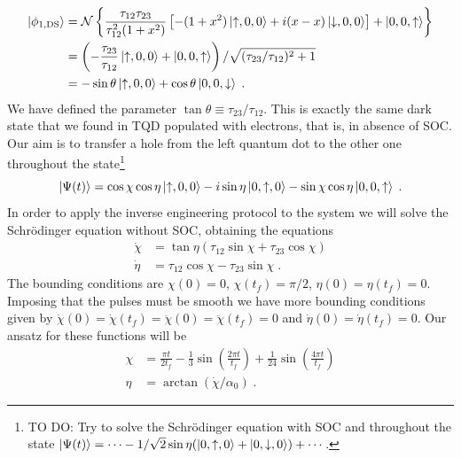 \documentclass[a4paper,11pt]{article}
\begin{document}
\begin{equation}
	\begin{split}
	\ket{\phi_{1,\text{DS}}}&=\mathcal{N}\left\{\frac{\tau_{12}\tau_{23}}{\tau_{12}^2(1+x^2)}\left[-(1+x^2)\ket{\uparrow,0,0}+i(x-x)\ket{\downarrow,0,0}\right]+\ket{0,0,\uparrow}\right\}\\
	&=\left(-\frac{\tau_{23}}{\tau_{12}}\ket{\uparrow,0,0}+\ket{0,0,\uparrow}\right)/\sqrt{(\tau_{23}/\tau_{12})^2+1}\\
	&=-\sin\theta\ket{\uparrow,0,0}+\cos\theta\ket{0,0,\downarrow}\; .
	\end{split}
\end{equation}
We have defined the parameter $\tan\theta\equiv\tau_{23}/\tau_{12}$. This is exactly the same dark state that we found in TQD populated with electrons\cite{Ban2018}, that is, in absence of SOC. Our aim is to transfer a hole from the left quantum dot to the other one throughout the state\footnote{TO DO: Try to solve the Schrödinger equation with SOC and throughout the state $\ket{\Psi(t)}=\cdots -1/\sqrt{2}\sin\eta(\ket{0,\uparrow,0}+\ket{0,\downarrow,0})+\cdots$.}
\begin{equation}
	\ket{\Psi(t)}=\cos\chi\cos\eta\ket{\uparrow,0,0}-i\sin\eta\ket{0,\uparrow,0}-\sin\chi\cos\eta\ket{0,0,\uparrow}\; .
	\label{eq:ansatz_wave_fanction}
\end{equation}
In order to apply the inverse engineering protocol to the system we will solve the Schrödinger equation without SOC, obtaining the equations
\begin{equation}
	\begin{split}
	\dot{{\chi}}&=\tan\eta(\tau_{12}\sin\chi+\tau_{23}\cos\chi)\\
	\dot{\eta}&=\tau_{12}\cos\chi-\tau_{23}\sin\chi\; .
	\label{eq:pulses_equations}
	\end{split}
\end{equation}
The bounding conditions are $\chi(0)=0$, $\chi(t_f)=\pi/2$, $\eta(0)=\eta(t_f)=0$. Imposing that the pulses must be smooth we have more bounding conditions given by $\dot{\chi}(0)=\dot{\chi}(t_f)=\ddot{\chi}(0)=\ddot{\chi}(t_f)=0$ and $\dot{\eta}(0)=\dot{\eta}(t_f)=0$. Our ansatz for these functions will be
\begin{equation}
	\begin{split}
	\chi&=\frac{\pi t}{2t_f}-\frac{1}{3}\sin(\frac{2\pi t}{t_f})+\frac{1}{24}\sin(\frac{4\pi t}{t_f})\\
	\eta&=\arctan(\dot{\chi}/\alpha_0)\; .
	\end{split}
\end{equation}
\end{document}

